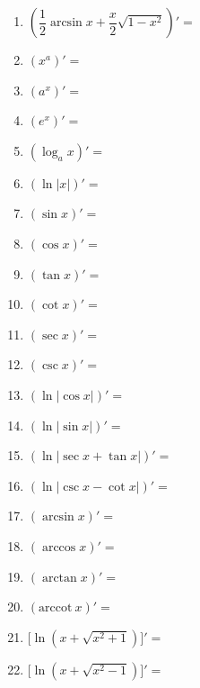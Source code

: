 \documentclass[./book.tex]{subfiles}
\begin{document}
    \pagestyle{empty}

    \begin{enumerate}
        \item $(\dfrac{1}{2}\arcsin x + \dfrac{x}{2}\sqrt{1 - x^2})' =$
    \end{enumerate}

    \begin{minipage}[t]{0.30\textwidth}
        \begin{enumerate}[leftmargin=*, itemsep=1.2em]
            \setcounter{enumi}{1}
            \item $(x^a)' =$

            \item $(a^x)' =$

            \item $(e^x)' =$

            \item $(\log_a x)' =$

            \item $(\ln |x|)' =$

            \item $(\sin x)' =$
            \item $(\cos x)' =$
            \item $(\tan x)' =$
            \item $(\cot x)' =$
            \item $(\sec x)' =$
            \item $(\csc x)' =$
            \item $(\ln|\cos x|)' =$
            \item $(\ln|\sin x|)' =$
            \item $(\ln|\sec x + \tan x|)' =$
            \item $(\ln|\csc x - \cot x|)'=$
            \item $(\arcsin x)' =$
            \item $(\arccos x)' =$
            \item $(\arctan x)' =$
            \item $(\mathrm{arccot}\ x)' =$

            \item $\bigl[\ln (x+\sqrt{x^2+1})\bigr]' =$

            \item $\bigl[\ln (x+\sqrt{x^2-1})\bigr]' =$
        \end{enumerate}
    \end{minipage}
    \hfill
\end{document}
